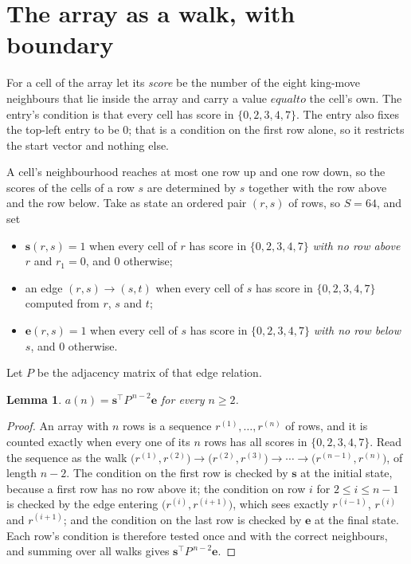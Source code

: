 \documentclass[11pt,a4paper]{article}
\theoremstyle{plain}
\newtheorem{lemma}[theorem]{Lemma}
\theoremstyle{definition}
\begin{document}
\section{The array as a walk, with boundary}

For a cell of the array let its \emph{score} be the number of the eight king-move neighbours that lie inside
the array and carry a value $equal to$ the cell's own. The entry's condition is that every cell
has score in $\{0,2,3,4,7\}$. The entry also fixes the top-left entry to be $0$; that is a condition on the first row alone, so it restricts the start vector and nothing else.

A cell's neighbourhood reaches at most one row up and one row down, so the scores of the
cells of a row $s$ are determined by $s$ together with the row above and the row below.
Take as state an ordered pair $(r,s)$ of rows, so $S=64$, and set
\begin{itemize}
\item $\mathbf{s}(r,s)=1$ when every cell of $r$ has score in $\{0,2,3,4,7\}$ \emph{with no row
above $r$} and $r_1=0$, and $0$ otherwise;
\item an edge $(r,s)\to(s,t)$ when every cell of $s$ has score in $\{0,2,3,4,7\}$ computed from
$r$, $s$ and $t$;
\item $\mathbf{e}(r,s)=1$ when every cell of $s$ has score in $\{0,2,3,4,7\}$ \emph{with no row
below $s$}, and $0$ otherwise.
\end{itemize}
Let $P$ be the adjacency matrix of that edge relation.

\begin{lemma}\label{lem:walk}
$a(n)=\mathbf{s}^{\!\top}P^{\,n-2}\mathbf{e}$ for every $n\ge2$.
\end{lemma}

\begin{proof}
An array with $n$ rows is a sequence $r^{(1)},\dots,r^{(n)}$ of rows, and it is counted
exactly when every one of its $n$ rows has all scores in $\{0,2,3,4,7\}$. Read the sequence as the
walk $\bigl(r^{(1)},r^{(2)}\bigr)\to\bigl(r^{(2)},r^{(3)}\bigr)\to\cdots\to
\bigl(r^{(n-1)},r^{(n)}\bigr)$, of length $n-2$. The condition on the first row is
checked by $\mathbf{s}$ at the initial state, because a first row has no row above it; the
condition on row $i$ for $2\le i\le n-1$ is checked by the edge entering
$\bigl(r^{(i)},r^{(i+1)}\bigr)$, which sees exactly $r^{(i-1)}$, $r^{(i)}$ and
$r^{(i+1)}$; and the condition on the last row is checked by $\mathbf{e}$ at the final
state. Each row's condition is therefore tested once and with the correct neighbours, and
summing over all walks gives $\mathbf{s}^{\!\top}P^{\,n-2}\mathbf{e}$.
\end{proof}
\end{document}
